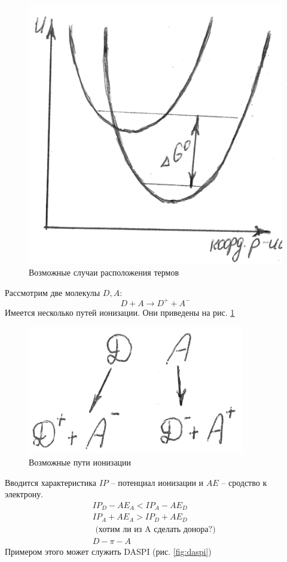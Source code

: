 \begin{lecture}
\begin{lecSection}
\begin{figure}[H]
\begin{minipage}[h]{0.28\linewidth}
		\centering\includegraphics[width=\linewidth]{lecture_04/new_graph3}
	\end{minipage}
	\caption{Возможные случаи расположения термов}
	\end{figure}

	Рассмотрим две молекулы $ D, A $:
	\begin{equation*}
		D + A \rightarrow D^{+} + A^{-}
	\end{equation*}
	Имеется несколько путей ионизации. Они приведены на рис. \ref{fig:possible_ways_of_ionization}
	\begin{figure}
		\centering\includegraphics{lecture_04/new_diag1}
		\caption{Возможные пути ионизации}
		\label{fig:possible_ways_of_ionization}
	\end{figure}
	Вводится характеристика $ IP $ -- потенциал ионизации и $ AE $ -- сродство к электрону.
	\begin{gather*}
		IP_D - AE_A < IP_A - AE_D \\
		IP_A + AE_A > IP_D + AE_D \\
		\text{ (хотим ли из A сделать донора?) } \\
		D - \pi - A
	\end{gather*}
	Примером этого может служить DASPI (рис. \ref{fig:daspi})
	

\end{lecSection}
\end{lecture}
